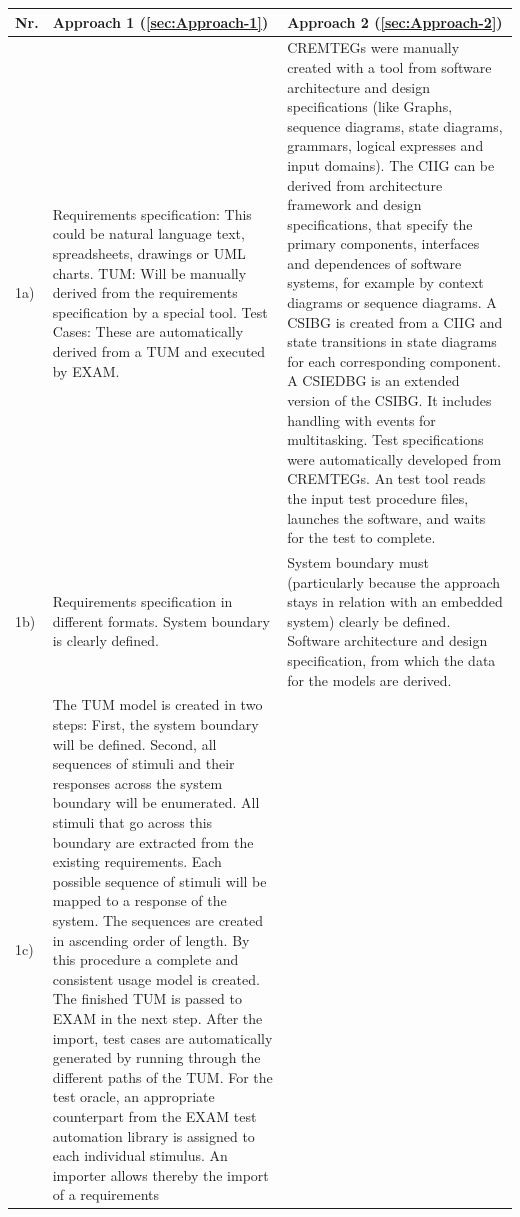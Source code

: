 \begin{small} 		
	\begin{longtable}[h]{p{0.45cm}|p{}|p{}}
\hline 
\textbf{Nr.} & \textbf {Approach 1 (\autoref{sec:Approach-1})}  & \textbf{Approach 2 (\autoref{sec:Approach-2})}\\
\hline 
1a)  & Requirements specification: This could be natural language text, spreadsheets,
drawings or UML charts. TUM: Will be manually derived from the requirements
specification by a special tool. Test Cases: These are automatically
derived from a TUM and executed by EXAM.  & CREMTEGs were manually created with a tool from software architecture
and design specifications (like Graphs, sequence diagrams, state diagrams,
grammars, logical expresses and input domains). The CIIG can be derived
from architecture framework and design specifications, that specify
the primary components, interfaces and dependences of software systems,
for example by context diagrams or sequence diagrams. A CSIBG is created
from a CIIG and state transitions in state diagrams for each corresponding
component. A CSIEDBG is an extended version of the CSIBG. It includes
handling with events for multitasking. Test specifications were automatically
developed from CREMTEGs. An test tool reads the input test procedure
files, launches the software, and waits for the test to complete.\\
\hline 
1b) & Requirements specification in different formats. System boundary is
clearly defined.  & System boundary must (particularly because the approach stays in relation
with an embedded system) clearly be defined. Software architecture
and design specification, from which the data for the models are derived.\\
\hline 
1c)  & The TUM model is created in two steps: First, the system boundary
will be defined. Second, all sequences of stimuli and their responses
across the system boundary will be enumerated. All stimuli that go
across this boundary are extracted from the existing requirements.
Each possible sequence of stimuli will be mapped to a response of
the system. The sequences are created in ascending order of length.
By this procedure a complete and consistent usage model is created.
The finished TUM is passed to EXAM in the next step. After the import,
test cases are automatically generated by running through the different
paths of the TUM. For the test oracle, an appropriate counterpart
from the EXAM test automation library is assigned to each individual
stimulus. An importer allows thereby the import of a requirements

\end{longtable}
\end{small}
